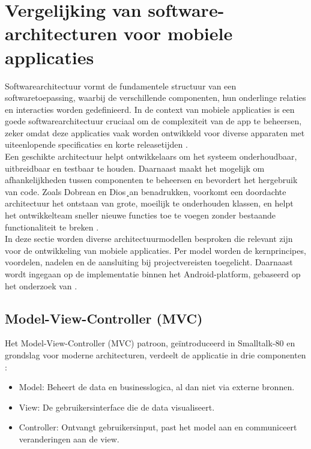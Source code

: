 \section{Vergelijking van software-architecturen voor mobiele applicaties}

Softwarearchitectuur vormt de fundamentele structuur van een softwaretoepassing, waarbij de verschillende componenten, hun onderlinge relaties en interacties worden gedefinieerd. In de context van mobiele applicaties is een goede softwarearchitectuur cruciaal om de complexiteit van de app te beheersen, zeker omdat deze applicaties vaak worden ontwikkeld voor diverse apparaten met uiteenlopende specificaties en korte releasetijden \autocite{Dobrean2019}. \\

Een geschikte architectuur helpt ontwikkelaars om het systeem onderhoudbaar, uitbreidbaar en testbaar te houden. Daarnaast maakt het mogelijk om afhankelijkheden tussen componenten te beheersen en bevordert het hergebruik van code. Zoals Dobrean en Dios¸an benadrukken, voorkomt een doordachte architectuur het ontstaan van grote, moeilijk te onderhouden klassen, en helpt het ontwikkelteam sneller nieuwe functies toe te voegen zonder bestaande functionaliteit te breken \autocite{Dobrean2019}.\\

In deze sectie worden diverse architectuurmodellen besproken die relevant zijn voor de ontwikkeling van mobiele applicaties. Per model worden de kernprincipes, voordelen, nadelen en de aansluiting bij projectvereisten toegelicht. Daarnaast wordt ingegaan op de implementatie binnen het Android-platform, gebaseerd op het onderzoek van \textcite{Lou2016}.\\

\subsection{Model-View-Controller (MVC)}
Het Model-View-Controller (MVC) patroon, geïntroduceerd in Smalltalk-80 en grondslag voor moderne architecturen, verdeelt de applicatie in drie componenten \autocite{Lou2016}:  
\begin{itemize}
	\item Model: Beheert de data en businesslogica, al dan niet via externe bronnen.  
	\item View: De gebruikersinterface die de data visualiseert.  
	\item Controller: Ontvangt gebruikersinput, past het model aan en communiceert veranderingen aan de view.  
\end{itemize}

